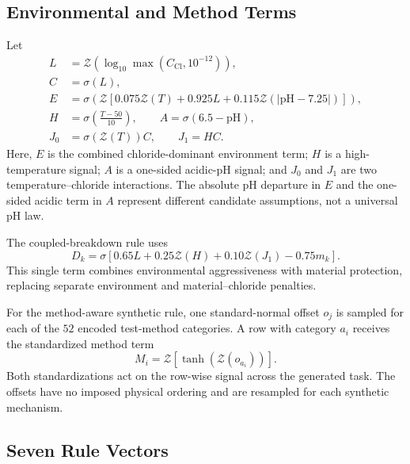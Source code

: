 \documentclass{article}
\begin{document}
\subsection{Environmental and Method Terms}

Let
\begin{align}
L&=\mathcal{Z}\!\left(\log_{10}\max(C_{\mathrm{Cl}},10^{-12})\right),\\
C&=\sigma(L),\\
E&=\sigma\!\left(\mathcal{Z}\!\left[
 0.075\mathcal{Z}(T)+0.925L+0.115\mathcal{Z}(|\mathrm{pH}-7.25|)
\right]\right),\\
H&=\sigma\!\left(\frac{T-50}{10}\right),\qquad
A=\sigma(6.5-\mathrm{pH}),\\
J_0&=\sigma(\mathcal{Z}(T))C,\qquad J_1=HC.
\label{eq:rule-environment-signals}
\end{align}
Here, \(E\) is the combined chloride-dominant environment term; \(H\) is
a high-temperature signal; \(A\) is a one-sided acidic-pH signal; and
\(J_0\) and \(J_1\) are two temperature--chloride interactions. The
absolute pH departure in \(E\) and the one-sided acidic term in \(A\)
represent different candidate assumptions, not a universal pH law.

The coupled-breakdown rule uses
\begin{equation}
D_k=\sigma\!\left[
0.65L+0.25\mathcal{Z}(H)+0.10\mathcal{Z}(J_1)-0.75m_k
\right].
\label{eq:rule-coupled}
\end{equation}
This single term combines environmental aggressiveness with material
protection, replacing separate environment and material--chloride penalties.

For the method-aware synthetic rule, one standard-normal offset \(o_j\) is
sampled for each of the \(52\) encoded test-method categories. A row with
category \(a_i\) receives the standardized method term
\begin{equation}
M_i=\mathcal{Z}\!\left[\tanh\!\left(\mathcal{Z}(o_{a_i})\right)\right].
\label{eq:rule-method}
\end{equation}
Both standardizations act on the row-wise signal across the generated task.
The offsets have no imposed physical ordering and are resampled for each
synthetic mechanism.

\subsection{Seven Rule Vectors}
\end{document}
